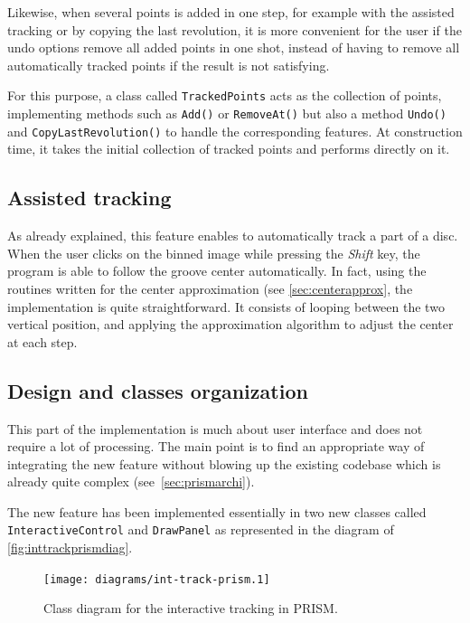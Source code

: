 Likewise, when several points is added in one step, for example with the assisted tracking or by copying the last revolution, it is more convenient for the user if the undo options remove all added points in one shot, instead of having to remove all automatically tracked points if the result is not satisfying.

For this purpose, a class called \texttt{TrackedPoints} acts as the collection of points, implementing methods such as \texttt{Add()} or \texttt{RemoveAt()} but also a method \texttt{Undo()} and \texttt{CopyLastRevolution()} to handle the corresponding features. At construction time, it takes the initial collection of tracked points and performs directly on it.

\subsection{Assisted tracking}

As already explained, this feature enables to automatically track a part of a disc. When the user clicks on the binned image while pressing the \emph{Shift} key, the program is able to follow the groove center automatically. In fact, using the routines written for the center approximation (see \autoref{sec:centerapprox}, the implementation is quite straightforward. It consists of looping between the two vertical position, and applying the approximation algorithm to adjust the center at each step.

\subsection{Design and classes organization}

This part of the implementation is much about user interface and does not require a lot of processing. The main point is to find an appropriate way of integrating the new feature without blowing up the existing codebase which is already quite complex (see~\autoref{sec:prismarchi}).

The new feature has been implemented essentially in two new classes called \texttt{InteractiveControl} and \texttt{DrawPanel} as represented in the diagram of \autoref{fig:inttrackprismdiag}.

\begin{figure}[!ht]
\centering
\texttt{[image: diagrams/int-track-prism.1]}
\caption{Class diagram for the interactive tracking in PRISM.}
\label{fig:inttrackprismdiag}
\end{figure}

